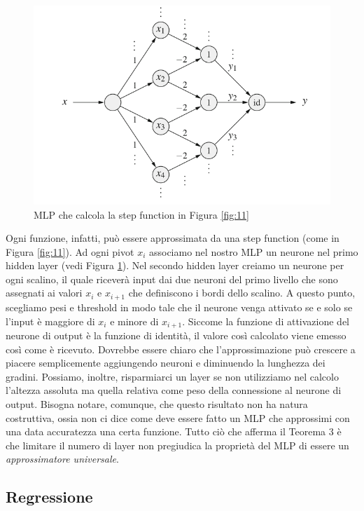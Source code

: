 \documentclass[10pt,a4paper]{article}
\begin{document}
\begin{figure}
\centering
\includegraphics[scale=0.3]{img/riemann.png}
\caption{MLP che calcola la step function in Figura \ref{fig:11}}
\label{fig:12}
\end{figure}

Ogni funzione, infatti, può essere approssimata da una step function (come in Figura \ref{fig:11}). Ad ogni pivot $x_i$ associamo nel nostro MLP un neurone nel primo hidden layer (vedi Figura \ref{fig:12}). Nel secondo hidden layer creiamo un neurone per ogni scalino, il quale riceverà input dai due neuroni del primo livello che sono assegnati ai valori $x_i$ e $x_{i+1}$ che definiscono i bordi dello scalino. A questo punto, scegliamo pesi e threshold in modo tale che il neurone venga attivato se e solo se l'input è maggiore di $x_i$ e minore di $x_{i+1}$. Siccome la funzione di attivazione del neurone di output è la funzione di identità, il valore così calcolato viene emesso così come è ricevuto. 
Dovrebbe essere chiaro che l'approssimazione può crescere a piacere semplicemente aggiungendo neuroni e diminuendo la lunghezza dei gradini. Possiamo, inoltre, risparmiarci un layer se non utilizziamo nel calcolo l'altezza assoluta ma quella relativa come peso della connessione al neurone di output.
Bisogna notare, comunque, che questo risultato non ha natura costruttiva, ossia non ci dice come deve essere fatto un MLP che approssimi con una data accuratezza una certa funzione. Tutto ciò che afferma il Teorema 3 è che limitare il numero di layer non pregiudica la proprietà del MLP di essere un \emph{approssimatore universale}.

\subsection{Regressione}
\end{document}
